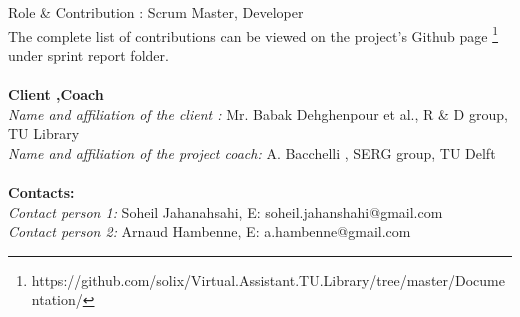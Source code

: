    Role \& Contribution : Scrum Master, Developer\\
The complete list of contributions can be viewed on the project's Github page \footnote{https://github.com/solix/Virtual.Assistant.TU.Library/tree/master/Documentation/} under sprint report folder.\\\\
\textbf{Client ,Coach \\}
\textit{Name and affiliation of the client : } Mr. Babak Dehghenpour et al., R \& D group, TU Library\\
\textit{Name and affiliation of the project coach:} A. Bacchelli , SERG group, TU Delft \\\\
\textbf{Contacts: \\}
\textit{Contact person 1: } Soheil Jahanahsahi, E: soheil.jahanshahi@gmail.com \\
\textit{Contact person 2: } Arnaud Hambenne, E: a.hambenne@gmail.com 


